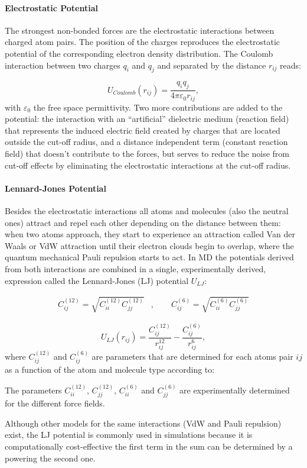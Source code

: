 \paragraph{Electrostatic Potential}

The strongest non-bonded forces are the electrostatic interactions
between charged atom pairs. The position of the charges reproduces
the electrostatic potential of the corresponding electron density
distribution. The Coulomb interaction between two charges $q_{i}$
and $q_{j}$ and separated by the distance $r_{ij}$ reads:

\begin{equation}
U_{Coulomb}(r_{ij})=\frac{q_{i}q_{j}}{4\pi\varepsilon_{0}r_{ij}},
\end{equation}
with $\varepsilon_{0}$ the free space permittivity. Two more contributions
are added to the potential: the interaction with an ``artificial''
dielectric medium (reaction field) that represents the induced electric
field created by charges that are located outside the cut-off radius,
and a distance independent term (constant reaction field) that doesn't
contribute to the forces, but serves to reduce the noise from cut-off
effects by eliminating the electrostatic interactions at the cut-off
radius.

\paragraph{Lennard-Jones Potential}

Besides the electrostatic interactions all atoms and molecules (also
the neutral ones) attract and repel each other depending on the distance
between them: when two atoms approach, they start to experience an
attraction \textemdash{} called Van der Waals or VdW attraction \textemdash{}
until their electron clouds begin to overlap, where the quantum mechanical
Pauli repulsion starts to act. In MD the potentials derived from both
interactions are combined in a single, experimentally derived, expression
called the Lennard-Jones (LJ) potential $U_{LJ}$:

\[

\begin{aligned}C_{ij}^{(12)}=\sqrt{C_{ii}^{(12)}C_{jj}^{(12)}} & ,\qquad C_{ij}^{(6)}=\sqrt{C_{ii}^{(6)}C_{jj}^{(6)}}\end{aligned}

\]

\begin{equation}
U_{LJ}(r_{ij})=\frac{C_{ij}^{(12)}}{r_{ij}^{12}}-\frac{C_{ij}^{(6)}}{r_{ij}^{6}},
\end{equation}
where $C_{ij}^{(12)}$ and $C_{ij}^{(6)}$ are parameters that are
determined for each atoms pair $ij$ as a function of the atom and
molecule type according to:

The parameters $C_{ii}^{(12)}$, $C_{jj}^{(12)}$, $C_{ii}^{(6)}$
and $C_{jj}^{(6)}$ are experimentally determined for the different
force fields.

Although other models for the same interactions (VdW and Pauli repulsion)
exist, the LJ potential is commonly used in simulations because it
is computationally cost-effective \textendash{} the first term in
the sum can be determined by a powering the second one.
